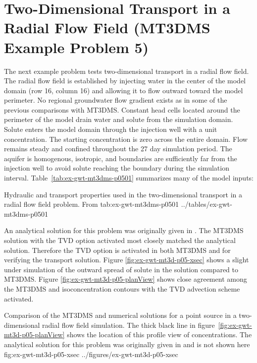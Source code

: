 \section{Two-Dimensional Transport in a Radial Flow Field (MT3DMS Example Problem 5)}

The next example problem tests two-dimensional transport in a radial flow field.  The radial flow field is established by injecting water in the center of the model domain (row 16, column 16) and allowing it to flow outward toward the model perimeter. No regional groundwater flow gradient exists as in some of the previous comparisons with MT3DMS. Constant head cells located around the perimeter of the model drain water and solute from the simulation domain. Solute enters the model domain through the injection well with a unit concentration.  The starting concentration is zero across the entire domain. Flow remains steady and confined throughout the 27 day simulation period. The aquifer is homogenous, isotropic, and boundaries are sufficiently far from the injection well to avoid solute reaching the boundary during the simulation interval. Table~\ref{tab:ex-gwt-mt3dms-p0501} summarizes many of the model inputs:

\begin{StandardTable}
	{Hydraulic and transport properties used in the two-dimensional transport in a radial flow field problem.  From \cite{zheng1999mt3dms}}
	{tab:ex-gwt-mt3dms-p0501}
	{../tables/ex-gwt-mt3dms-p0501}
\end{StandardTable}

An analytical solution for this problem was originally given in \cite{moench1981}. The MT3DMS solution with the TVD option activated most closely matched the analytical solution.  Therefore the TVD option is activated in both MT3DMS and \mf for verifying the transport solution. Figure \ref{fig:ex-gwt-mt3d-p05-xsec} shows a slight under simulation of the outward spread of solute in the \mf solution compared to MT3DMS. Figure \ref{fig:ex-gwt-mt3d-p05-planView} shows close agreement among the MT3DMS and \mf isoconcentration contours with the TVD advection scheme activated. 

\begin{StandardFigure}
	{Comparison of the MT3DMS and \mf numerical solutions for a point source in a two-dimensional radial flow field simulation.  The thick black line in figure~\ref{fig:ex-gwt-mt3d-p05-planView} shows the location of this profile view of concentrations.  The analytical solution for this problem was originally given in \citep{moench1981} and is not shown here} 
	{fig:ex-gwt-mt3d-p05-xsec}
	{../figures/ex-gwt-mt3d-p05-xsec}
\end{StandardFigure}

